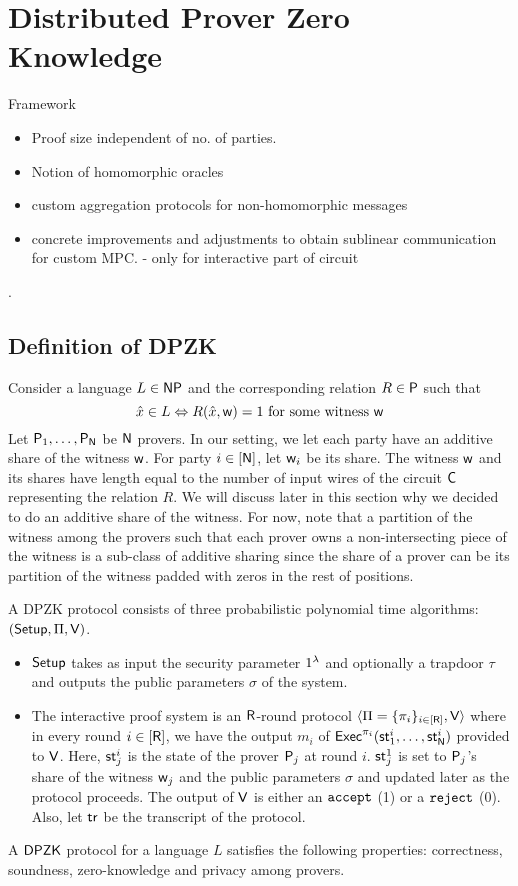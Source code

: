 \section{Distributed Prover Zero Knowledge}
Framework
\begin{itemize}
\item Proof size independent of no. of parties.
\item Notion of homomorphic oracles
\item custom aggregation protocols for non-homomorphic messages
\item concrete improvements and adjustments to obtain sublinear communication for custom MPC. - only for interactive part of circuit
\end{itemize}
. 
\subsection{Definition of DPZK}
Consider a language $L \in \mathsf{NP}$ and the corresponding relation $R \in \mathsf{P}$ such that
\[
\hat{x} \in L \Leftrightarrow R(\hat{x}, \mathsf{w})=1 \text{ for some witness } \mathsf{w}
\]
Let $\mathsf{P}_1, \ldots, \mathsf{P}_{\mathsf{N}}$ be $\mathsf{N}$ provers. In our setting, we let each party have an additive share of the witness $\mathsf{w}$. For party $i \in [\mathsf{N}]$, let $\mathsf{w}_i$ be its share.  The witness $\mathsf{w}$ and its shares have length equal to the number of input wires of the circuit $\mathsf{C}$ representing the relation $R$. We will discuss later in this section why we decided to do an additive share of the witness. For now, note that a partition of the witness among the provers such that each prover owns a non-intersecting piece of the witness is a sub-class of additive sharing since the share of a prover can be its partition of the witness padded with zeros in the rest of positions.


A DPZK protocol consists of three probabilistic polynomial time algorithms: $(\mathsf{Setup}, \Pi, \mathsf{V})$. 
\begin{itemize}
\item $\mathsf{Setup}$ takes as input the security parameter $1^{\lambda}$ and optionally a trapdoor $\tau$ and outputs the public parameters $\sigma$ of the system.
\item The interactive proof system is an $\mathsf{R}$-round protocol $\langle \Pi = \{\pi_i\}_{i \in [\mathsf{R}]}, \mathsf{V} \rangle$ where in every round $i \in [\mathsf{R}]$, we have the output $m_i$ of $\mathsf{Exec}^{\pi_i}(\mathsf{st}^i_1, \ldots, \mathsf{st}^i_{\mathsf{N}})$ provided to $\mathsf{V}$. Here, $\mathsf{st}^i_j$ is the state of the prover $\mathsf{P}_j$ at round $i$. $\mathsf{st}^1_j$ is set to $\mathsf{P}_j$'s share of the witness $\mathsf{w}_j$ and the public parameters $\sigma$ and updated later as the protocol proceeds. The output of $\mathsf{V}$ is either an $\tt accept$ (1) or a $\tt{reject}$ (0). Also, let $\mathsf{tr}$ be the transcript of the protocol.
\end{itemize}
A $\mathsf{DPZK}$ protocol for a language $L$ satisfies the following properties: 
correctness, soundness, zero-knowledge and privacy among provers.
